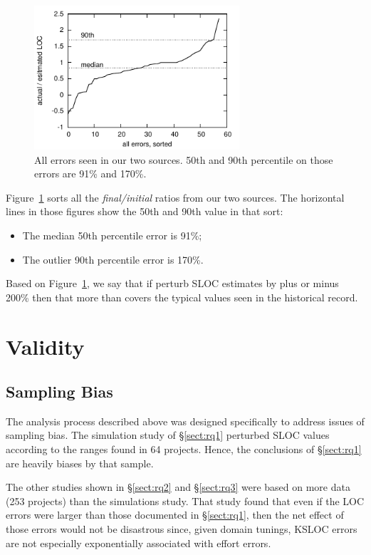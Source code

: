 \documentclass[final,twocolumn,5p]{elsarticle}
\newcommand{\bi}{\begin{itemize}[leftmargin=0.4cm]}
\newcommand{\ei}{\end{itemize}}
\newcommand{\tion}[1]{\S\ref{sect:#1}}
\newcommand{\fig}[1]{Figure~\ref{fig:#1}}
\theoremstyle{break}
\begin{document}
 
\begin{figure}
\includegraphics[width=3in]{all.pdf}
\caption{All errors seen in our two sources. 50th and 90th percentile on those errors are 91\% and 170\%.}\label{fig:allerr}
\end{figure}

\fig{allerr} sorts all the {\em final/initial} ratios from our two sources. The horizontal lines in those figures show
the 50th and 90th value in that sort:
\bi
\item The median 50th percentile error is 91\%;
 \item The outlier 90th percentile error is 170\%.
   \ei
   Based on \fig{allerr}, we say that if perturb SLOC estimates by plus or minus 200\% then that more than covers the typical
   values seen in the historical record.

   
    
   

 
  

\section{Validity}

\subsection{Sampling Bias}
The analysis process described above was designed specifically to
address issues of sampling bias.   The simulation study of \tion{rq1} perturbed SLOC values according to the ranges found
in 64 projects. Hence, the conclusions of \tion{rq1} are heavily biases by that sample.

The other studies shown in \tion{rq2} and \tion{rq3} were based on more data (253 projects) than the simulations study.  That study
found that even if the LOC errors were larger than those documented in \tion{rq1}, then the net effect of 
those errors would not be disastrous since, given domain tunings,   KSLOC  errors are  not especially exponentially associated with effort errors. 
 
\end{document}
